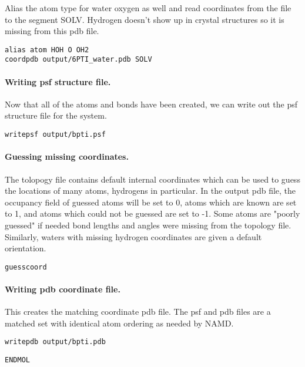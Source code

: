 Alias the atom type for water oxygen as well and read coordinates from
the file to the segment SOLV.  Hydrogen doesn't show up in crystal
structures so it is missing from this pdb file.

\begin{verbatim}
alias atom HOH O OH2
coordpdb output/6PTI_water.pdb SOLV
\end{verbatim}


\paragraph*{Writing psf structure file.}


Now that all of the atoms and bonds have been created, we can write
out the psf structure file for the system.

\begin{verbatim}
writepsf output/bpti.psf
\end{verbatim}

\paragraph*{Guessing missing coordinates.}


The tolopogy file contains default internal coordinates which can be
used to guess the locations of many atoms, hydrogens in particular.
In the output pdb file, the occupancy field of guessed atoms will be
set to 0, atoms which are known are set to 1, and atoms which could
not be guessed are set to -1.  Some atoms are "poorly guessed" if
needed bond lengths and angles were missing from the topology file.
Similarly, waters with missing hydrogen coordinates are given a
default orientation.

\begin{verbatim}
guesscoord
\end{verbatim}

\paragraph*{Writing pdb coordinate file.}


This creates the matching coordinate pdb file.  The psf and pdb files
are a matched set with identical atom ordering as needed by NAMD.

\begin{verbatim}
writepdb output/bpti.pdb
\end{verbatim}

\begin{verbatim}
ENDMOL
\end{verbatim}


